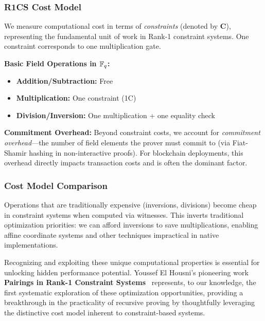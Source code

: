 \subsubsection{R1CS Cost Model}

We measure computational cost in terms of \textit{constraints} (denoted by \textbf{C}), representing the fundamental unit of work in Rank-1 constraint systems. One constraint corresponds to one multiplication gate.

\textbf{Basic Field Operations in $\mathbb{F}_q$:}
\begin{itemize}
\item \textbf{Addition/Subtraction:} Free
\item \textbf{Multiplication:} One constraint (1C)
\item \textbf{Division/Inversion:} One multiplication + one equality check
\end{itemize}

\textbf{Commitment Overhead:} Beyond constraint costs, we account for \textit{commitment overhead}---the number of field elements the prover must commit to (via Fiat-Shamir hashing in non-interactive proofs). For blockchain deployments, this overhead directly impacts transaction costs and is often the dominant factor.

\subsubsection{Cost Model Comparison}

Operations that are traditionally expensive (inversions, divisions) become cheap in constraint systems when computed via witnesses. This inverts traditional optimization priorities: we can afford inversions to save multiplications, enabling affine coordinate systems and other techniques impractical in native implementations.

Recognizing and exploiting these unique computational properties is essential for unlocking hidden performance potential. Youssef El Housni's pioneering work \textbf{Pairings in Rank-1 Constraint Systems}~\cite{PR1CS22} represents, to our knowledge, the first systematic exploration of these optimization opportunities, providing a breakthrough in the practicality of recursive proving by thoughtfully leveraging the distinctive cost model inherent to constraint-based systems.
